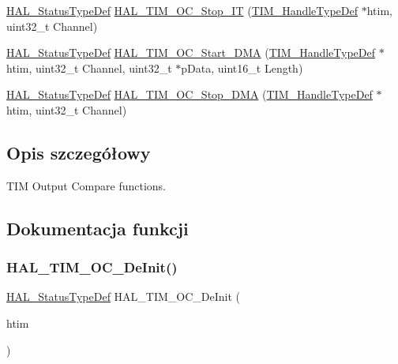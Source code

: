 \begin{DoxyCompactItemize}
\item 
\hyperlink{stm32f4xx__hal__def_8h_a63c0679d1cb8b8c684fbb0632743478f}{H\+A\+L\+\_\+\+Status\+Type\+Def} \hyperlink{group___t_i_m___exported___functions___group2_gacc324ef35c0b207a8331c657d86fc1bd}{H\+A\+L\+\_\+\+T\+I\+M\+\_\+\+O\+C\+\_\+\+Stop\+\_\+\+IT} (\hyperlink{struct_t_i_m___handle_type_def}{T\+I\+M\+\_\+\+Handle\+Type\+Def} $\ast$htim, uint32\+\_\+t Channel)
\item 
\hyperlink{stm32f4xx__hal__def_8h_a63c0679d1cb8b8c684fbb0632743478f}{H\+A\+L\+\_\+\+Status\+Type\+Def} \hyperlink{group___t_i_m___exported___functions___group2_ga6f961349029a84317b7734abbfb9a02c}{H\+A\+L\+\_\+\+T\+I\+M\+\_\+\+O\+C\+\_\+\+Start\+\_\+\+D\+MA} (\hyperlink{struct_t_i_m___handle_type_def}{T\+I\+M\+\_\+\+Handle\+Type\+Def} $\ast$htim, uint32\+\_\+t Channel, uint32\+\_\+t $\ast$p\+Data, uint16\+\_\+t Length)
\item 
\hyperlink{stm32f4xx__hal__def_8h_a63c0679d1cb8b8c684fbb0632743478f}{H\+A\+L\+\_\+\+Status\+Type\+Def} \hyperlink{group___t_i_m___exported___functions___group2_ga27f1f66d2d38ec428580a5feb3628c48}{H\+A\+L\+\_\+\+T\+I\+M\+\_\+\+O\+C\+\_\+\+Stop\+\_\+\+D\+MA} (\hyperlink{struct_t_i_m___handle_type_def}{T\+I\+M\+\_\+\+Handle\+Type\+Def} $\ast$htim, uint32\+\_\+t Channel)
\end{DoxyCompactItemize}


\subsection{Opis szczegółowy}
T\+IM Output Compare functions. 



\subsection{Dokumentacja funkcji}
\mbox{\label{group___t_i_m___exported___functions___group2_ga79f0c3e3015a81c535a578edc2fee8ca}} 
\subsubsection{\texorpdfstring{H\+A\+L\+\_\+\+T\+I\+M\+\_\+\+O\+C\+\_\+\+De\+Init()}{HAL\_TIM\_OC\_DeInit()}}
{\footnotesize\ttfamily \hyperlink{stm32f4xx__hal__def_8h_a63c0679d1cb8b8c684fbb0632743478f}{H\+A\+L\+\_\+\+Status\+Type\+Def} H\+A\+L\+\_\+\+T\+I\+M\+\_\+\+O\+C\+\_\+\+De\+Init (\begin{DoxyParamCaption}\item[{\hyperlink{struct_t_i_m___handle_type_def}{T\+I\+M\+\_\+\+Handle\+Type\+Def} $\ast$}]{htim }\end{DoxyParamCaption})}

